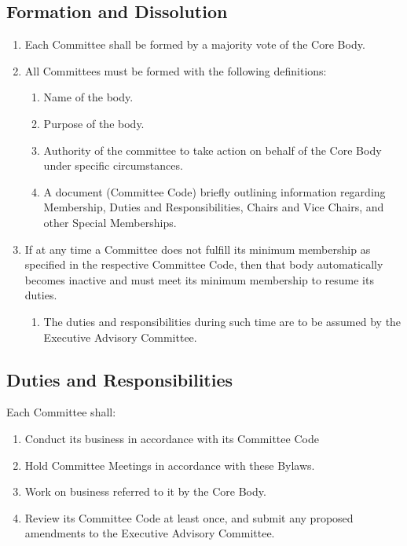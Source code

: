 \documentclass{article}
\newenvironment{li}{
\begin{enumerate}
  \setlength{\itemsep}{1pt}
  \setlength{\parskip}{0pt}
  \setlength{\parsep}{0pt}
}{\end{enumerate}}
\begin{document}
\subsection{Formation and Dissolution}
\begin{li}
\item Each Committee shall be formed by a majority vote of the Core Body.
\item All Committees must be formed with the following definitions:
	\begin{li}
	\item Name of the body.
	\item Purpose of the body.
	\item Authority of the committee to take action on behalf of the Core Body under specific circumstances.
	\item A document (Committee Code) briefly outlining information regarding Membership, Duties and Responsibilities, Chairs and Vice Chairs, and other Special Memberships.
	\end{li}
\item If at any time a Committee does not fulfill its minimum membership as specified in the respective Committee Code, then that body automatically becomes inactive and must meet its minimum membership to resume its duties.
	\begin{li}
	\item The duties and responsibilities during such time are to be assumed by the Executive Advisory Committee.
	\end{li}
\end{li}

\subsection{Duties and Responsibilities}
Each Committee shall:
\begin{li}
\item Conduct its business in accordance with its Committee Code
\item Hold Committee Meetings in accordance with these Bylaws.
\item Work on business referred to it by the Core Body.
\item Review its Committee Code at least once, and submit any proposed amendments to the Executive Advisory Committee.
\end{li}

\end{document}
